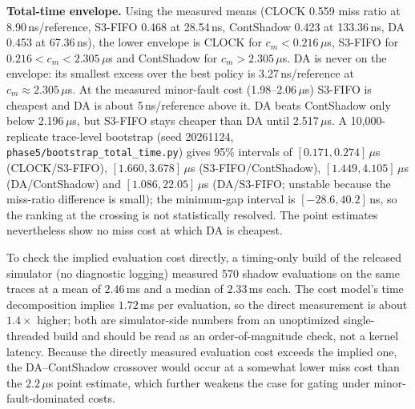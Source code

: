 \documentclass[journal,onecolumn]{IEEEtran}
\begin{document}
\textbf{Total-time envelope.}
Using the measured means (CLOCK 0.559 miss ratio at 8.90\,ns/reference,
S3-FIFO 0.468 at 28.54\,ns, ContShadow 0.423 at 133.36\,ns, DA 0.453 at
67.36\,ns), the lower envelope is CLOCK for $c_m<0.216\,\mu$s, S3-FIFO for
$0.216<c_m<2.305\,\mu$s and ContShadow for $c_m>2.305\,\mu$s. DA is never on
the envelope: its smallest excess over the best policy is
3.27\,ns/reference at $c_m\approx2.305\,\mu$s. At the measured minor-fault
cost (1.98--2.06\,$\mu$s) S3-FIFO is cheapest and DA is about 5\,ns/reference
above it. DA beats ContShadow only below 2.196\,$\mu$s, but S3-FIFO stays
cheaper than DA until 2.517\,$\mu$s. A 10,000-replicate trace-level bootstrap
(seed 20261124, \texttt{phase5/bootstrap\_total\_time.py}) gives 95\% intervals
of $[0.171,0.274]\,\mu$s (CLOCK/S3-FIFO), $[1.660,3.678]\,\mu$s
(S3-FIFO/ContShadow), $[1.449,4.105]\,\mu$s (DA/ContShadow) and
$[1.086,22.05]\,\mu$s (DA/S3-FIFO; unstable because the miss-ratio difference
is small); the minimum-gap interval is $[-28.6,40.2]$\,ns, so the ranking at
the crossing is not statistically resolved. The point estimates nevertheless
show no miss cost at which DA is cheapest.

To check the implied evaluation cost directly, a timing-only build of the
released simulator (no diagnostic logging) measured 570 shadow evaluations on
the same traces at a mean of $2.46$\,ms and a median of $2.33$\,ms each. The
cost model's time decomposition implies $1.72$\,ms per evaluation, so the
direct measurement is about $1.4\times$ higher; both are simulator-side
numbers from an unoptimized single-threaded build and should be read as an
order-of-magnitude check, not a kernel latency. Because the directly measured
evaluation cost exceeds the implied one, the DA--ContShadow crossover would
occur at a somewhat lower miss cost than the $2.2\,\mu$s point estimate, which
further weakens the case for gating under minor-fault-dominated costs.
\end{document}
